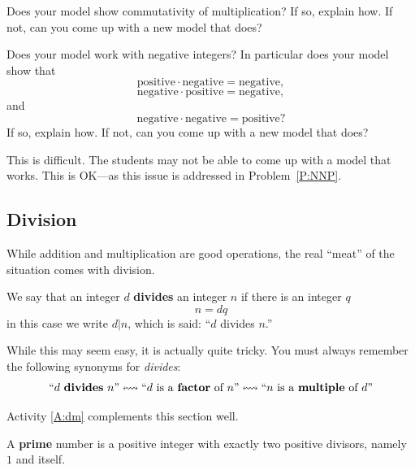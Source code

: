 \begin{question}
Does your model show commutativity of multiplication? If so, explain
how. If not, can you come up with a new model that does?
\end{question}
\QM


\begin{question}
Does your model work with negative integers? In particular does your
model show that
\[
\text{positive}\cdot \text{negative} = \text{negative},
\]
\[
\text{negative}\cdot \text{positive} = \text{negative},
\]
and 
\[
\text{negative}\cdot \text{negative} = \text{positive}?
\]
If so, explain how. If not, can you come up with a new model that
does?
\end{question}
\QM

\begin{teachingnote}
This is difficult. The students may not be able to come up with a
model that works. This is OK---as this issue is addressed in
Problem~\ref{P:NNP}.
\end{teachingnote}


\subsection{Division} 

While addition and multiplication are good operations, the real
``meat'' of the situation comes with division.


\begin{definition}    %
We say that an integer $d$ \textbf{divides} an integer $n$ if there is
an integer $q$
\[
n = dq
\]
in this case we write $d | n$, which is said: ``$d$ divides $n$.'' 
\end{definition}

While this may seem easy, it is actually quite tricky. You must always
remember the following synonyms for \textit{divides}:
\[\index{multiple}\index{factor}
\text{``$d$ \textbf{divides} $n$''}\leftrightsquigarrow \text{``$d$ is
  a \textbf{factor} of $n$''}\leftrightsquigarrow \text{``$n$ is a
  \textbf{multiple} of $d$''}
\]


\begin{activitynote}
Activity \ref{A:dm} complements this section well.  %
\end{activitynote}



\begin{definition} 
A \textbf{prime} number is a positive integer with exactly two
positive divisors, namely $1$ and itself.
\end{definition}

